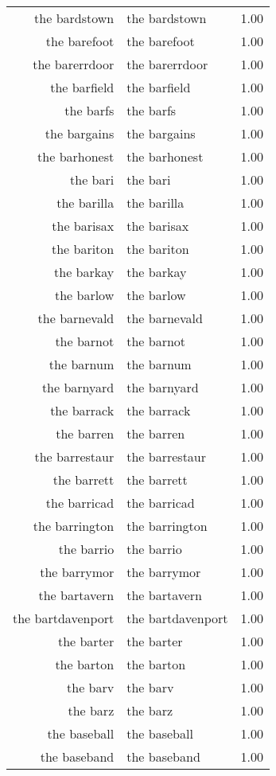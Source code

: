 \begin{table}[ht]
\begin{tabular}{rlr}
  the bardstown & the bardstown & 1.00 \\ 
  the barefoot & the barefoot & 1.00 \\ 
  the barerrdoor & the barerrdoor & 1.00 \\ 
  the barfield & the barfield & 1.00 \\ 
  the barfs & the barfs & 1.00 \\ 
  the bargains & the bargains & 1.00 \\ 
  the barhonest & the barhonest & 1.00 \\ 
  the bari & the bari & 1.00 \\ 
  the barilla & the barilla & 1.00 \\ 
  the barisax & the barisax & 1.00 \\ 
  the bariton & the bariton & 1.00 \\ 
  the barkay & the barkay & 1.00 \\ 
  the barlow & the barlow & 1.00 \\ 
  the barnevald & the barnevald & 1.00 \\ 
  the barnot & the barnot & 1.00 \\ 
  the barnum & the barnum & 1.00 \\ 
  the barnyard & the barnyard & 1.00 \\ 
  the barrack & the barrack & 1.00 \\ 
  the barren & the barren & 1.00 \\ 
  the barrestaur & the barrestaur & 1.00 \\ 
  the barrett & the barrett & 1.00 \\ 
  the barricad & the barricad & 1.00 \\ 
  the barrington & the barrington & 1.00 \\ 
  the barrio & the barrio & 1.00 \\ 
  the barrymor & the barrymor & 1.00 \\ 
  the bartavern & the bartavern & 1.00 \\ 
  the bartdavenport & the bartdavenport & 1.00 \\ 
  the barter & the barter & 1.00 \\ 
  the barton & the barton & 1.00 \\ 
  the barv & the barv & 1.00 \\ 
  the barz & the barz & 1.00 \\ 
  the baseball & the baseball & 1.00 \\ 
  the baseband & the baseband & 1.00 \\ 

\end{tabular}
\end{table}
